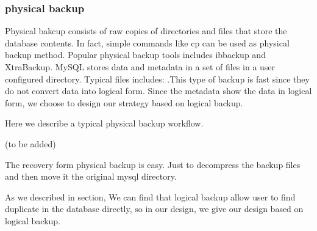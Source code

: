 \subsubsection{physical backup}

Physical bakcup consists of raw copies of directories and files that store the database contents\citep{mysqlbackupdocumentation}. In fact, simple commands like cp can be used as physical backup method. Popular physical backup tools includes ibbackup and XtraBackup\citep{xtrabackup}. MySQL stores data and metadata in a set of files in a user configured directory. Typical files includes:  .This type of backup is fast since they do not convert data into logical form. Since the metadata show the data in logical form, we choose to design our strategy based on logical backup. 


Here we describe a typical physical backup workflow. 

(to be added)

The recovery form physical backup is easy. Just to decompress the backup files and then move it the original mysql directory. 




As we described in section, We can find that logical backup allow user to find duplicate in the database directly, so in our design, we give our design based on logical backup.

